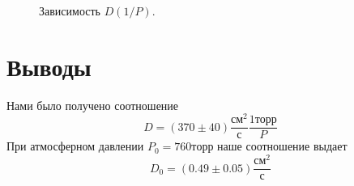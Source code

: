 \documentclass{article}
\begin{document}
    \begin{figure}[h]
        \caption{Зависимость $D(1/P)$.}
        \label{ustanovka}
    \end{figure}

    \newpage
    \section{Выводы}
    Нами было получено соотношение
    \[D = (370 \pm 40)\frac{см^2}{с} \frac{1торр}{P}\]
    При атмосферном давлении $P_0=760 торр$ наше соотношение выдает
    \[D_0 = (0.49 \pm 0.05)\frac{см^2}{с}\]
\end{document}
